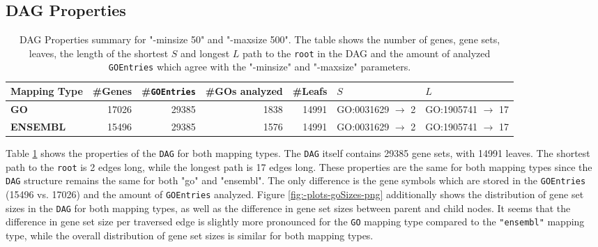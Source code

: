 \documentclass[12pt]{article}
\begin{document}
\newpage
\subsection{DAG Properties}\label{sec:DAG-Properties}

\begin{table}[htpb]
    \centering
    \setlength{\tabcolsep}{4pt} %
    \caption{DAG Properties summary for "-minsize 50" and "-maxsize 500". The table shows the number of genes, gene sets, leaves, the length of the shortest $S$ and longest $L$ path to the \texttt{root} in the DAG and the amount of analyzed \texttt{GOEntries} which 
    agree with the "-minsize" and "-maxsize" parameters.} \label{tab:dag_properties}
    \small %
\begin{tabular}{|l|r|r|r|r|l|l|} \hline
     \textbf{Mapping Type} & \#Genes & \#\texttt{GOEntries} & \#GOs analyzed & \#Leafs & $S$ & $L$ \\ \hline
     \textbf{GO} & 17026 & 29385 & 1838 & 14991 & GO:0031629 $\to$ 2 & GO:1905741 $\to$ 17 \\ \hline
     \textbf{ENSEMBL} & 15496 & 29385 & 1576 & 14991 & GO:0031629 $\to$ 2 & GO:1905741 $\to$ 17 \\ \hline
\end{tabular}
\end{table}

Table \ref{tab:dag_properties} shows the properties of the \texttt{DAG} for both mapping
types. The \texttt{DAG} itself contains 29385 gene sets, with 14991 leaves. The shortest
path to the \texttt{root} is 2 edges long, while the longest path is 17 edges long.
These properties are the same for both mapping types since the \texttt{DAG} structure remains the
same for both "go" and "ensembl". The only difference is the gene symbols which are
stored in the \texttt{GOEntries} (15496 vs. 17026) and the amount of \texttt{GOEntries} 
analyzed.
Figure \ref{fig:-plots-goSizes-png} additionally shows the distribution of gene set sizes in the \texttt{DAG} for both mapping types,
as well as the difference in gene set sizes between parent and child nodes.
It seems that the difference in gene set size per traversed edge is slightly more pronounced for the \texttt{GO} mapping type compared to the \texttt{"ensembl"} mapping type,
while the overall distribution of gene set sizes is similar for both mapping types.
\end{document}
